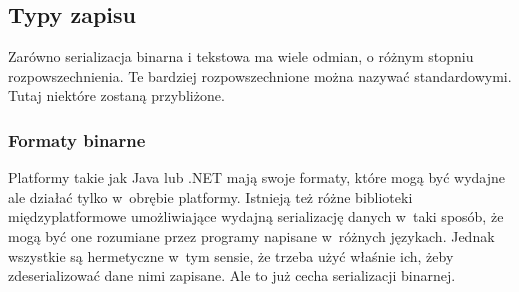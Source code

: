 



\subsection{Typy zapisu}
Zarówno serializacja binarna i tekstowa ma wiele odmian, o różnym stopniu rozpowszechnienia. Te bardziej rozpowszechnione można nazywać standardowymi. Tutaj niektóre zostaną przybliżone.

\subsubsection{Formaty binarne}
Platformy takie jak Java lub .NET mają swoje formaty, które mogą być wydajne ale działać tylko w~obrębie platformy.
Istnieją też różne biblioteki międzyplatformowe umożliwiające wydajną serializację danych w~taki sposób, że mogą być one rozumiane przez programy napisane w~różnych językach.
Jednak wszystkie są hermetyczne w~tym sensie, że trzeba użyć właśnie ich, żeby zdeserializować dane nimi zapisane. Ale to już cecha serializacji binarnej.

